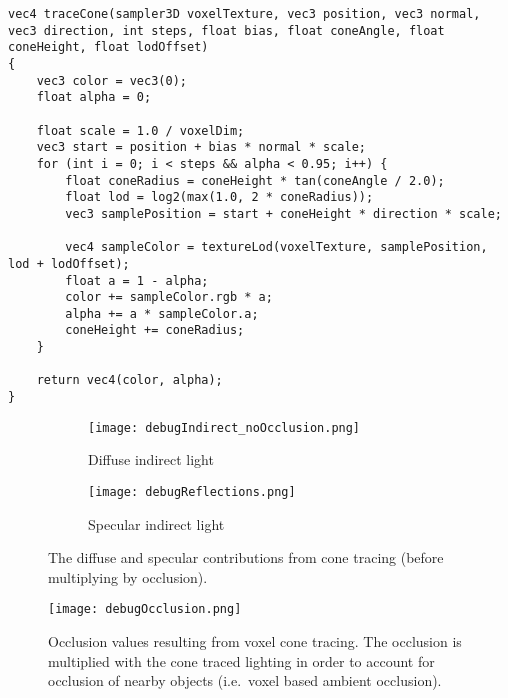 \begin{lstlisting}[caption={Shader function for performing voxel cone tracing.},label={lst:vct}]
vec4 traceCone(sampler3D voxelTexture, vec3 position, vec3 normal, vec3 direction, int steps, float bias, float coneAngle, float coneHeight, float lodOffset)
{
    vec3 color = vec3(0);
    float alpha = 0;

    float scale = 1.0 / voxelDim;
    vec3 start = position + bias * normal * scale;
    for (int i = 0; i < steps && alpha < 0.95; i++) {
        float coneRadius = coneHeight * tan(coneAngle / 2.0);
        float lod = log2(max(1.0, 2 * coneRadius));
        vec3 samplePosition = start + coneHeight * direction * scale;

        vec4 sampleColor = textureLod(voxelTexture, samplePosition, lod + lodOffset);
        float a = 1 - alpha;
        color += sampleColor.rgb * a;
        alpha += a * sampleColor.a;
        coneHeight += coneRadius;
    }

    return vec4(color, alpha);
}
\end{lstlisting}


\begin{figure}[h!]
\centering
    \begin{subfigure}[t]{\textwidth}
        \texttt{[image: debugIndirect\_noOcclusion.png]}
        \caption{Diffuse indirect light}
    \end{subfigure}
    \begin{subfigure}[t]{\textwidth}
        \texttt{[image: debugReflections.png]}    %
        \caption{Specular indirect light}
    \end{subfigure}
    \caption{The diffuse and specular contributions from cone tracing (before multiplying by occlusion).}
    \label{fig:debugindirect}
\end{figure}

\begin{figure}[h!]
\centering
    \texttt{[image: debugOcclusion.png]}
    \caption{Occlusion values resulting from voxel cone tracing. The occlusion is multiplied with the cone traced lighting in order to account for occlusion of nearby objects (i.e.\ voxel based ambient occlusion).}
    \label{fig:debugocclusion}
\end{figure}

